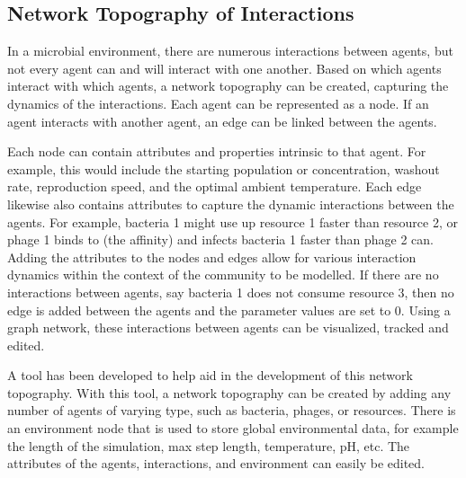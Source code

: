 \subsection{Network Topography of Interactions}
In a microbial environment, there are numerous interactions between agents, but not every agent can and will interact with one another.
Based on which agents interact with which agents, a network topography can be created, capturing the dynamics of the interactions.
Each agent can be represented as a node.
If an agent interacts with another agent, an edge can be linked between the agents.

Each node can contain attributes and properties intrinsic to that agent. 
For example, this would include the starting population or concentration, washout rate, reproduction speed, and the optimal ambient temperature. 
Each edge likewise also contains attributes to capture the dynamic interactions between the agents. 
For example, bacteria 1 might use up resource 1 faster than resource 2, or phage 1 binds to (the affinity) and infects bacteria 1 faster than phage 2 can. 
Adding the attributes to the nodes and edges allow for various interaction dynamics within the context of the community to be modelled. 
If there are no interactions between agents, say bacteria 1 does not consume resource 3, then no edge is added between the agents and the parameter values are set to 0. 
Using a graph network, these interactions between agents can be visualized, tracked and edited. \newline 

A tool has been developed to help aid in the development of this network topography.
With this tool, a network topography can be created by adding any number of agents of varying type, such as bacteria, phages, or resources.
There is an environment node that is used to store global environmental data, for example the length of the simulation, max step length, temperature, pH, etc.
The attributes of the agents, interactions, and environment can easily be edited. \newline 

